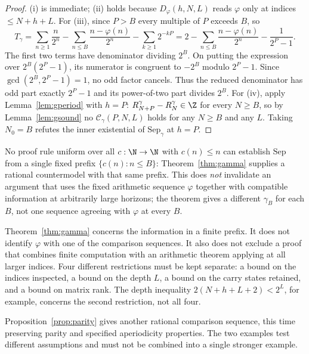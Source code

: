 \begin{proof}
(i) is immediate; (ii) holds because $D_\varphi(h,N,L)$ reads $\varphi$ only at
indices $\le N{+}h{+}L$. For (iii), since $P > B$ every multiple of $P$ exceeds
$B$, so
\[
  T_\gamma
  = \sum_{n\ge1}\frac{n}{2^{n}} - \sum_{n \le B}\frac{n - \varphi(n)}{2^{n}}
    - \sum_{k \ge 1} 2^{-kP}
  = 2 - \sum_{n \le B}\frac{n-\varphi(n)}{2^{n}} - \frac{1}{2^{P}-1}.
\]
The first two terms have denominator dividing $2^B$. On putting the
expression over $2^B(2^P-1)$, its numerator is congruent to $-2^B$ modulo
$2^P-1$. Since $\gcd(2^B,2^P-1)=1$, no odd factor cancels. Thus the
reduced denominator has odd part exactly $2^P-1$ and its power-of-two part
divides $2^B$. For (iv), apply Lemma~\ref{lem:gperiod} with $h=P$:
$R^{\gamma}_{N+P} - R^{\gamma}_{N} \in \Z$ for every $N \ge B$, so by
Lemma~\ref{lem:gsound} no $\mathcal C_\gamma(P,N,L)$ holds for any
$N \ge B$ and any $L$. Taking $N_0 = B$ refutes the inner existential of
$\mathrm{Sep}_\gamma$ at $h = P$.
\end{proof}

\begin{cor}
\label{cor:b1}
No proof rule uniform over all $c:\N\to\N$ with $c(n)\le n$ can
establish $\mathrm{Sep}$ from a single fixed prefix
$\{c(n):n\le B\}$: Theorem~\ref{thm:gamma} supplies a rational countermodel
with that same prefix.  This does \emph{not} invalidate an argument that uses
the fixed arithmetic sequence $\varphi$ together with compatible information
at arbitrarily large horizons; the theorem gives a different $\gamma_B$ for
each $B$, not one sequence agreeing with $\varphi$ at every $B$.
\end{cor}

\begin{rem}
\label{rem:b1-scope}
Theorem~\ref{thm:gamma} concerns the information in a finite prefix.
It does not identify $\varphi$ with one of the comparison sequences. It also
does not exclude a proof that combines finite computation with an arithmetic
theorem applying at all larger indices. Four different restrictions must
be kept separate: a bound on the indices inspected, a bound on the depth
$L$, a bound on the carry states retained, and a bound on matrix rank.
The depth inequality $2(N+h+L+2)<2^L$, for example, concerns the second
restriction, not all four.
\end{rem}

Proposition~\ref{prop:parity} gives another rational comparison sequence,
this time preserving parity and specified aperiodicity properties. The two
examples test different assumptions and must not be combined into a single
stronger example.



